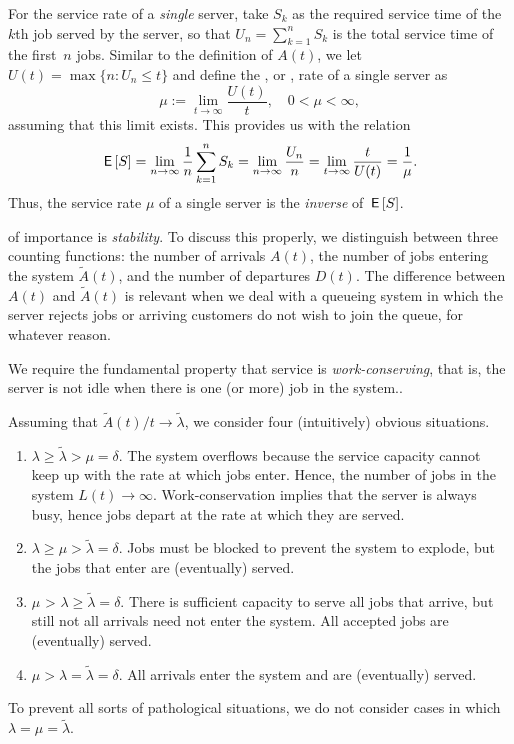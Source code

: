 \documentclass[stochastic-or.tex]{subfiles}
\begin{document}
For the service rate of a \emph{single} server, take $S_k$ as the required service time of the~$k$th job served by the server, so that $U_n = \sum_{k=1}^n S_k$ is the total service time of the first~$n$ jobs.
Similar to the definition of $A(t)$, we let $ U(t) = \max\{n: U_n \leq t\}$ and define the , or , rate of a single server as
\begin{equation*}
 \mu := \lim_{t\to\infty} \frac{U(t)}t, \quad 0 < \mu < \infty,
\end{equation*}
assuming that this limit exists. This provides us with the relation
\begin{equation*}
 \,\mathsf{E}\left[S\right] = \lim_{n\to\infty} \frac 1 n \sum_{k=1}^n S_k = \lim_{n\to\infty} \frac{U_n}{n} = \lim_{t\to\infty} \frac t{U(t)} = \frac 1 \mu.
\end{equation*}
Thus, the service rate $\mu$ of a single server is the \emph{inverse} of $\,\mathsf{E}\left[S\right]$.

 of importance is \emph{stability}.
To discuss this properly, we distinguish between three counting functions: the number of arrivals $A(t)$, the number of jobs entering the system $\tilde A(t)$, and the number of departures $D(t)$.
The difference between $A(t)$ and $\tilde A(t)$ is relevant when we deal with a queueing system in which the server rejects jobs or arriving customers do not wish to join the queue, for whatever reason.

We require the fundamental property that service is \emph{work-conserving}, that is, the server is not idle when there is one (or more) job in the system..

Assuming that $\tilde A(t)/t \to \tilde \lambda$, we consider four (intuitively) obvious situations.
\begin{enumerate}
\item $\lambda \geq \tilde \lambda > \mu = \delta$. The system overflows because the service capacity cannot keep up with the rate at which jobs enter. Hence, the number of jobs in the system $L(t) \to \infty$. Work-conservation implies that the server is always busy, hence jobs depart at the rate at which they are served.
\item $\lambda \geq \mu > \tilde \lambda = \delta$. Jobs must be  blocked to prevent the system to explode, but the jobs that enter are (eventually) served.
\item $\mu$ > $\lambda \geq \tilde \lambda = \delta$.
There is sufficient capacity to serve all jobs that arrive, but still not all arrivals need not enter the system.
All accepted jobs are (eventually) served.
\item $\mu > \lambda = \tilde \lambda = \delta$. All arrivals enter the system and are (eventually) served.
\end{enumerate}
To prevent all sorts of pathological situations, we do not consider cases in which $\lambda = \mu = \tilde \lambda$.
\end{document}

